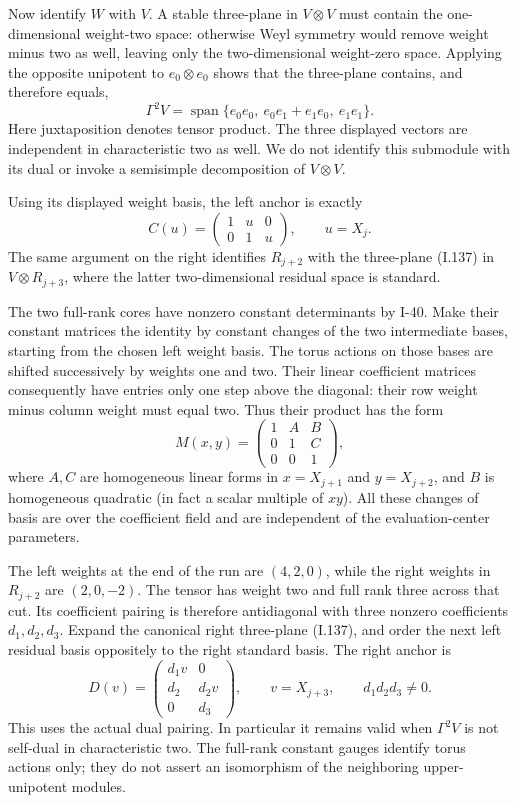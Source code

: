 Now identify $W$ with $V$. A stable three-plane in $V\otimes V$
must contain the one-dimensional weight-two space: otherwise
Weyl symmetry would remove weight minus two as well, leaving
only the two-dimensional weight-zero space. Applying the
opposite unipotent to $e_0\otimes e_0$ shows that the three-plane
contains, and therefore equals,
\[
 \Gamma^2 V=\operatorname{span}\{
 e_0e_0,\ e_0e_1+e_1e_0,\ e_1e_1\}.
 \tag{I.137}
\]
Here juxtaposition denotes tensor product. The three displayed
vectors are independent in characteristic two as well. We do
not identify this submodule with its dual or invoke a
semisimple decomposition of $V\otimes V$.

Using its displayed weight basis, the left anchor is exactly
\[
 C(u)=\begin{pmatrix}1&u&0\\0&1&u\end{pmatrix},
 \qquad u=X_j.
 \tag{I.138}
\]
The same argument on the right identifies $R_{j+2}$ with the
three-plane (I.137) in $V\otimes R_{j+3}$, where the latter
two-dimensional residual space is standard.

The two full-rank cores have nonzero constant determinants by
I-40. Make their constant matrices the identity by constant
changes of the two intermediate bases, starting from the chosen
left weight basis. The torus actions on those bases are shifted
successively by weights one and two. Their linear coefficient
matrices consequently have entries only one step above the
diagonal: their row weight minus column weight must equal two.
Thus their product has the form
\[
 M(x,y)=
 \begin{pmatrix}1&A&B\\0&1&C\\0&0&1\end{pmatrix},
 \tag{I.139}
\]
where $A,C$ are homogeneous linear forms in $x=X_{j+1}$ and
$y=X_{j+2}$, and $B$ is homogeneous quadratic (in fact a scalar
multiple of $xy$). All these changes of basis are over the
coefficient field and are independent of the evaluation-center
parameters.

The left weights at the end of the run are $(4,2,0)$, while
the right weights in $R_{j+2}$ are $(2,0,-2)$. The tensor has
weight two and full rank three across that cut. Its coefficient
pairing is therefore antidiagonal with three nonzero coefficients
$d_1,d_2,d_3$. Expand the canonical right three-plane (I.137),
and order the next left residual basis oppositely to the right
standard basis. The right anchor is
\[
 D(v)=\begin{pmatrix}d_1v&0\\d_2&d_2v\\0&d_3\end{pmatrix},
 \qquad v=X_{j+3},\qquad d_1d_2d_3\ne0.
 \tag{I.140}
\]
This uses the actual dual pairing. In particular it remains
valid when $\Gamma^2V$ is not self-dual in characteristic two.
The full-rank constant gauges identify torus actions only;
they do not assert an isomorphism of the neighboring
upper-unipotent modules.

